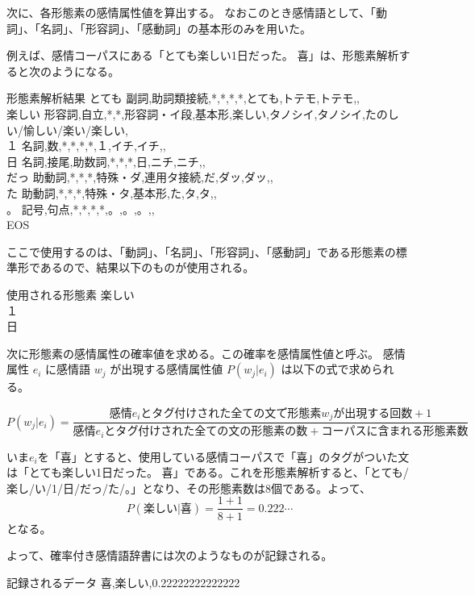 \documentclass[11pt,a4j]{jsarticle}
\begin{document}
次に、各形態素の感情属性値を算出する。
なおこのとき感情語として、「動詞」、「名詞」、「形容詞」、「感動詞」の基本形のみを用いた。

例えば、感情コーパスにある「とても楽しい1日だった。 喜」は、形態素解析すると次のようになる。

  \begin{itembox}{形態素解析結果}
    とても	副詞,助詞類接続,*,*,*,*,とても,トテモ,トテモ,,\\
    楽しい	形容詞,自立,*,*,形容詞・イ段,基本形,楽しい,タノシイ,タノシイ,たのしい/愉しい/楽い/楽しい,\\
    １	名詞,数,*,*,*,*,１,イチ,イチ,,\\
    日	名詞,接尾,助数詞,*,*,*,日,ニチ,ニチ,,\\
    だっ	助動詞,*,*,*,特殊・ダ,連用タ接続,だ,ダッ,ダッ,,\\
    た	助動詞,*,*,*,特殊・タ,基本形,た,タ,タ,,\\
    。	記号,句点,*,*,*,*,。,。,。,,\\
    EOS
  \end{itembox}

ここで使用するのは、「動詞」、「名詞」、「形容詞」、「感動詞」である形態素の標準形であるので、結果以下のものが使用される。

\begin{itembox}{使用される形態素}
   楽しい \\
   １\\
   日
 \end{itembox}
 
 次に形態素の感情属性の確率値を求める。この確率を感情属性値と呼ぶ。
 感情属性 $e_i$ に感情語 $w_j$ が出現する感情属性値 $P(w_j|e_i)$ は以下の式で求められる。

 \[
 P(w_j|e_i)=\frac{感情 e_i とタグ付けされた全ての文で形態素 w_j が出現する回数 +1}{感情 e_i とタグ付けされた全ての文の形態素の数 + コーパスに含まれる形態素数}
 \]

 いま$e_i$を「喜」とすると、使用している感情コーパスで「喜」のタグがついた文は「とても楽しい1日だった。 喜」である。これを形態素解析すると、「とても/楽し/い/1/日/だっ/た/。」となり、その形態素数は8個である。よって、
 \[
 P(楽しい|喜)=\frac{1 + 1}{8+1} = 0.222\cdots
 \]
 となる。

 よって、確率付き感情語辞書には次のようなものが記録される。
 \begin{itembox}{記録されるデータ}
   喜,楽しい,0.22222222222222 \\
 \end{itembox}
\end{document}
